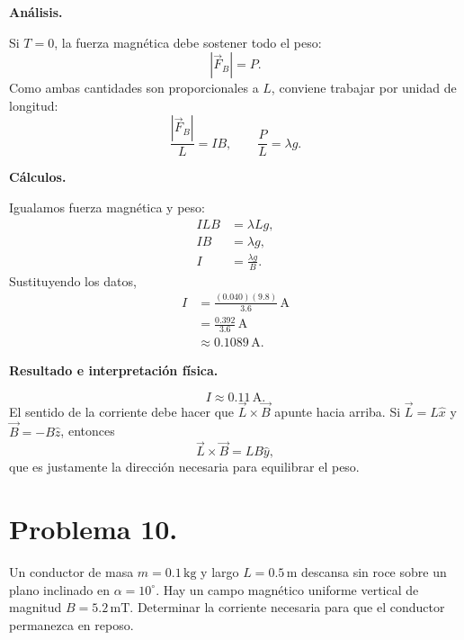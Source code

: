 \documentclass[11pt]{article}
\begin{document}
\par\medskip\noindent\textbf{Análisis.}\par\smallskip
Si $T=0$, la fuerza magn\'etica debe sostener todo el peso:
\begin{equation*}
    |\vec F_B|=P.
\end{equation*}
Como ambas cantidades son proporcionales a $L$, conviene trabajar por unidad de longitud:
\begin{equation*}
    \frac{|\vec F_B|}{L}=IB,
    \qquad
    \frac{P}{L}=\lambda g.
\end{equation*}

\par\medskip\noindent\textbf{Cálculos.}\par\smallskip
Igualamos fuerza magn\'etica y peso:
\begin{align*}
    ILB&=\lambda Lg,\\
    IB&=\lambda g,\\
    I&=\frac{\lambda g}{B}.
\end{align*}
Sustituyendo los datos,
\begin{align*}
    I&=\frac{(0.040)(9.8)}{3.6}\,\mathrm A\\
     &=\frac{0.392}{3.6}\,\mathrm A\\
     &\approx0.1089\,\mathrm A.
\end{align*}

\par\medskip\noindent\textbf{Resultado e interpretación física.}\par\smallskip
\begin{equation*}
    \boxed{I\approx0.11\,\mathrm A}.
\end{equation*}
El sentido de la corriente debe hacer que $\vec L\times\vec B$ apunte hacia arriba. Si $\vec L=L\hat x$ y $\vec B=-B\hat z$, entonces
\begin{equation*}
    \vec L\times\vec B=LB\hat y,
\end{equation*}
que es justamente la direcci\'on necesaria para equilibrar el peso.

\newpage

\section*{Problema 10.}
Un conductor de masa $m=0.1\,\mathrm{kg}$ y largo $L=0.5\,\mathrm m$ descansa sin roce sobre un plano inclinado en $\alpha=10^\circ$. Hay un campo magn\'etico uniforme vertical de magnitud $B=5.2\,\mathrm{mT}$. Determinar la corriente necesaria para que el conductor permanezca en reposo.
\end{document}

